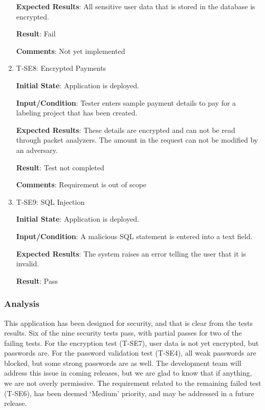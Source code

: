 \documentclass[12pt, titlepage]{article}
\begin{document}
\begin{enumerate}
\textbf{Expected Results}: All sensitive user data that is stored in the database is encrypted.
					
\textbf{Result}: Fail

\textbf{Comments}: Not yet implemented


\item{T-SE8: Encrypted Payments\\}


					
\textbf{Initial State}: Application is deployed.
					
\textbf{Input/Condition}: Tester enters sample payment details to pay for a labeling project that has been created.
					
\textbf{Expected Results}: These details are encrypted and can not be read through packet analyzers. The amount in the request can not be modified by an adversary.
					
\textbf{Result}: Test not completed

\textbf{Comments}: Requirement is out of scope


\item{T-SE9: SQL Injection\\}


					
\textbf{Initial State}: Application is deployed.
					
\textbf{Input/Condition}: A malicious SQL statement is entered into a text field.
					
\textbf{Expected Results}: The system raises an error telling the user that it is invalid.
					
\textbf{Result}: Pass

\end{enumerate}

\subsubsection{Analysis}
This application has been designed for security, and that is clear from the tests results. Six of the nine security tests pass, with partial passes for two of the failing tests. For the encryption test (T-SE7), user data is not yet encrypted, but passwords are. For the password validation test (T-SE4), 
all weak passwords are blocked, but some strong passwords are as well. The development team will address this issue in coming releases, but we are glad to know that if anything, we are not overly permissive. The requirement related to the remaining failed test (T-SE6), has been deemed `Medium' priority, and may be addressed in a future release.
\end{document}
